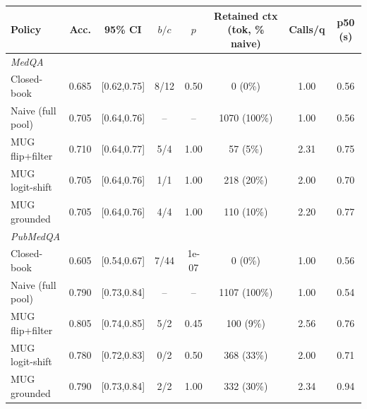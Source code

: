 \begin{tabular}{lccccccc}
\toprule
Policy & Acc. & 95\% CI & $b/c$ & $p$ & Retained ctx (tok, \% naive) & Calls/q & p50 (s) \\
\midrule
\multicolumn{8}{l}{\textit{MedQA}} \\
Closed-book & 0.685 & [0.62,0.75] & 8/12 & 0.50 & 0 (0\%) & 1.00 & 0.56 \\
Naive (full pool) & 0.705 & [0.64,0.76] & -- & -- & 1070 (100\%) & 1.00 & 0.56 \\
MUG flip+filter & 0.710 & [0.64,0.77] & 5/4 & 1.00 & 57 (5\%) & 2.31 & 0.75 \\
MUG logit-shift & 0.705 & [0.64,0.76] & 1/1 & 1.00 & 218 (20\%) & 2.00 & 0.70 \\
MUG grounded & 0.705 & [0.64,0.76] & 4/4 & 1.00 & 110 (10\%) & 2.20 & 0.77 \\
\midrule
\multicolumn{8}{l}{\textit{PubMedQA}} \\
Closed-book & 0.605 & [0.54,0.67] & 7/44 & 1e-07 & 0 (0\%) & 1.00 & 0.56 \\
Naive (full pool) & 0.790 & [0.73,0.84] & -- & -- & 1107 (100\%) & 1.00 & 0.54 \\
MUG flip+filter & 0.805 & [0.74,0.85] & 5/2 & 0.45 & 100 (9\%) & 2.56 & 0.76 \\
MUG logit-shift & 0.780 & [0.72,0.83] & 0/2 & 0.50 & 368 (33\%) & 2.00 & 0.71 \\
MUG grounded & 0.790 & [0.73,0.84] & 2/2 & 1.00 & 332 (30\%) & 2.34 & 0.94 \\
\bottomrule
\end{tabular}
